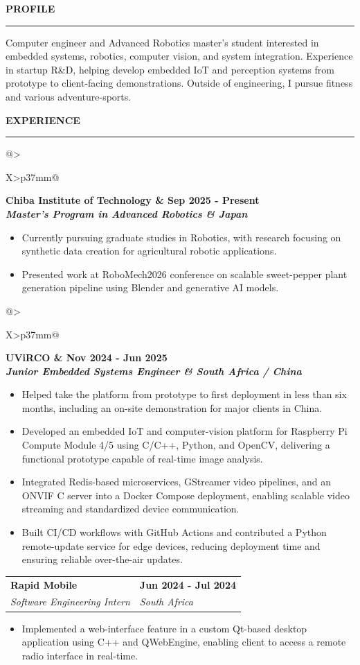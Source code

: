 \documentclass[10pt,a4paper]{article}
\makeatletter
\newcommand{\cvsection}[1]{%
  \vspace{0.90em}%
  {\color{cvblue}\bfseries\fontsize{11.2}{11.8}\selectfont #1}\par
    \vspace{-0.5em}%
  {\color{black!58}\rule{\linewidth}{0.35pt}}\par
  \vspace{0.38em}%
}
\newcommand{\job}[4]{%
  \begin{tabularx}{\linewidth}{@{}>{\raggedright\arraybackslash}X>{\raggedleft\arraybackslash}p{37mm}@{}}
    \bfseries #1 & \bfseries #2 \\
    \itshape #3 & \itshape #4
  \end{tabularx}\par
  \vspace{-0.10em}%
}
\makeatother
\begin{document}
\begin{minipage}[t]{0.686\textwidth}
	\RaggedRight
	\cvsection{PROFILE}
	Computer engineer and Advanced Robotics master’s student interested in embedded
	systems, robotics, computer vision, and system integration.
	Experience in startup R\&D, helping develop embedded IoT and perception systems
	from prototype to client-facing demonstrations.
	Outside of engineering, I pursue fitness and various adventure-sports.

	\cvsection{EXPERIENCE}
	\job{Chiba Institute of Technology}{Sep 2025 - Present}{Master's Program in Advanced Robotics}{Japan}
	\begin{itemize}
		\item Currently pursuing graduate studies in Robotics, with research focusing on synthetic data creation for agricultural robotic applications.
		\item Presented work at RoboMech2026 conference on scalable sweet-pepper plant generation pipeline using Blender and generative AI models.
	\end{itemize}

	\vspace{0.34em}%
	\job{UViRCO}{Nov 2024 - Jun 2025}{Junior Embedded Systems Engineer}{South Africa / China}
	\begin{itemize}
		\item Helped take the platform from prototype to first deployment in less than six months, including an on-site demonstration for major clients in China.
		\item Developed an embedded IoT and computer-vision platform for Raspberry Pi Compute Module 4/5 using C/C++, Python, and OpenCV, delivering a functional prototype capable of real-time image analysis.
		\item Integrated Redis-based microservices, GStreamer video pipelines, and an ONVIF C server into a Docker Compose deployment, enabling scalable video streaming and standardized device communication.
		\item Built CI/CD workflows with GitHub Actions and contributed a Python remote-update service for edge devices, reducing deployment time and ensuring reliable over-the-air updates.
	\end{itemize}
	\vspace{0.34em}%

	\job{Rapid Mobile}{Jun 2024 - Jul 2024}{Software Engineering Intern}{South Africa}
	\begin{itemize}
		\item Implemented a web-interface feature in a custom Qt-based desktop application using C++ and QWebEngine, enabling client to access a remote radio interface in real-time.
	\end{itemize}
	\vspace{0.34em}%


\end{minipage}
\end{document}
